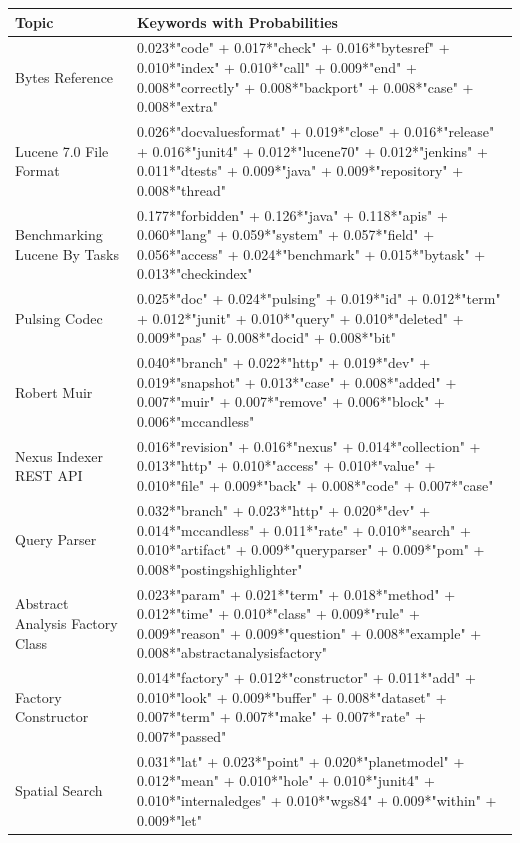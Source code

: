 \documentclass[a4paper,12pt,twoside]{report}
\begin{document}
\begin{table} %
    \centering
    \begin{adjustbox}{max width=\columnwidth}
    \def\arraystretch{1} %
    \begin{tabular}{p{3cm} p{12cm}}
        \toprule
        \textbf{Topic} & \textbf{Keywords with Probabilities}\\
        \midrule
			Bytes Reference & 0.023*"code" + 0.017*"check" + 0.016*"bytesref" + 0.010*"index" + 0.010*"call" + 0.009*"end" + 0.008*"correctly" + 0.008*"backport" + 0.008*"case" + 0.008*"extra" \\
			\midrule 
			Lucene 7.0 File Format & 0.026*"docvaluesformat" + 0.019*"close" + 0.016*"release" + 0.016*"junit4" + 0.012*"lucene70" + 0.012*"jenkins" + 0.011*"dtests" + 0.009*"java" + 0.009*"repository" + 0.008*"thread" \\ 
			\midrule 
			Benchmarking Lucene By Tasks & 0.177*"forbidden" + 0.126*"java" + 0.118*"apis" + 0.060*"lang" + 0.059*"system" + 0.057*"field" + 0.056*"access" + 0.024*"benchmark" + 0.015*"bytask" + 0.013*"checkindex" \\
			\midrule 
			Pulsing Codec & 0.025*"doc" + 0.024*"pulsing" + 0.019*"id" + 0.012*"term" + 0.012*"junit" + 0.010*"query" + 0.010*"deleted" + 0.009*"pas" + 0.008*"docid" + 0.008*"bit" \\
			\midrule 
			Robert Muir & 0.040*"branch" + 0.022*"http" + 0.019*"dev" + 0.019*"snapshot" + 0.013*"case" + 0.008*"added" + 0.007*"muir" + 0.007*"remove" + 0.006*"block" + 0.006*"mccandless" \\
			\midrule 
			Nexus Indexer REST API & 0.016*"revision" + 0.016*"nexus" + 0.014*"collection" + 0.013*"http" + 0.010*"access" + 0.010*"value" + 0.010*"file" + 0.009*"back" + 0.008*"code" + 0.007*"case" \\
			\midrule 
			Query Parser & 0.032*"branch" + 0.023*"http" + 0.020*"dev" + 0.014*"mccandless" + 0.011*"rate" + 0.010*"search" + 0.010*"artifact" + 0.009*"queryparser" + 0.009*"pom" + 0.008*"postingshighlighter" \\
			\midrule 
			Abstract Analysis Factory Class & 0.023*"param" + 0.021*"term" + 0.018*"method" + 0.012*"time" + 0.010*"class" + 0.009*"rule" + 0.009*"reason" + 0.009*"question" + 0.008*"example" + 0.008*"abstractanalysisfactory" \\
			\midrule 
			Factory Constructor & 0.014*"factory" + 0.012*"constructor" + 0.011*"add" + 0.010*"look" + 0.009*"buffer" + 0.008*"dataset" + 0.007*"term" + 0.007*"make" + 0.007*"rate" + 0.007*"passed" \\
			\midrule 
			Spatial Search & 0.031*"lat" + 0.023*"point" + 0.020*"planetmodel" + 0.012*"mean" + 0.010*"hole" + 0.010*"junit4" + 0.010*"internaledges" + 0.010*"wgs84" + 0.009*"within" + 0.009*"let" \\
        \midrule
    \end{tabular}
    \end{adjustbox}
    \label{tab:tmLucene}
\end{table} 
\end{document}
